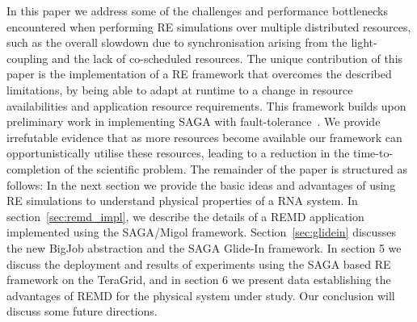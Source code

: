 \documentclass{rspublic}
\begin{document}
In this paper we address some of the challenges and performance
bottlenecks encountered when performing RE simulations over multiple
distributed resources, such as the overall slowdown due to
synchronisation arising from the light-coupling and the lack of
co-scheduled resources.  The unique contribution of this paper is the
implementation of a RE framework that overcomes the described
limitations, by being able to adapt at runtime to a change in resource
availabilities and application resource requirements.  This framework
builds upon preliminary work in implementing SAGA with
fault-tolerance~\citep{Luckow:2008la}. %
We provide irrefutable evidence that as more resources become
available our framework can opportunistically utilise these resources,
leading to a reduction in the time-to-completion of the scientific
problem.  The remainder of the paper is structured as follows: In the
next section we provide the basic ideas and advantages of using RE
simulations to understand physical properties of a RNA system. In
section~\ref{sec:remd_impl}, we describe the details of a REMD
application implemented using the SAGA/Mi\-gol
framework. Section~\ref{sec:glidein} discusses the new BigJob
abstraction and the SAGA Glide-In framework.  %
In section 5 we discuss the deployment and results of experiments
using the SAGA based RE framework on the TeraGrid, and in section 6 we
present data establishing the advantages of REMD for the physical
system under study. Our conclusion will discuss some future
directions. %



\end{document}
